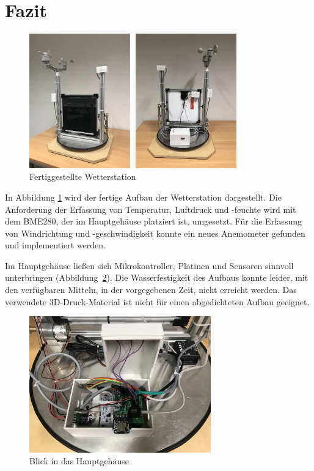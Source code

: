 \section{Fazit}\label{sec:fazit}
\begin{figure}[H]
  \centering
  \includegraphics[width=0.8\textwidth]{./img/Wetterstaion_fertig1.jpg}
  \caption{Fertiggestellte Wetterstation}\label{fig.Wetterstationfertig}
\end{figure}

In Abbildung \ref{fig.Wetterstationfertig} wird der fertige Aufbau der Wetterstation dargestellt. Die Anforderung der Erfassung von Temperatur, Luftdruck und -feuchte wird mit dem BME280, der im Hauptgehäuse platziert ist, umgesetzt. Für die Erfassung von Windrichtung und -geschwindigkeit konnte ein neues Anemometer gefunden und implementiert werden.

Im Hauptgehäuse ließen sich Mikrokontroller, Platinen und Sensoren sinnvoll unterbringen (Abbildung~\ref{fig.hauptgehauese}). Die Wasserfestigkeit des Aufbaus konnte leider, mit den verfügbaren Mitteln, in der vorgegebenen Zeit, nicht erreicht werden. Das verwendete 3D-Druck-Material ist nicht für einen abgedichteten Aufbau geeignet. 


\begin{figure}[H]
  \centering
  \includegraphics[width=0.7\textwidth]{./img/Hauptgehauese.jpg}
  \caption{Blick in das Hauptgehäuse}\label{fig.hauptgehauese}
\end{figure}

